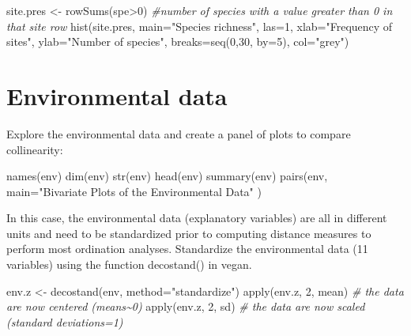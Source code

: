 \documentclass[
]{book}
\newenvironment{Shaded}{\begin{snugshade}}{\end{snugshade}}
\newcommand{\AttributeTok}[1]{\textcolor[rgb]{0.77,0.63,0.00}{#1}}
\newcommand{\CommentTok}[1]{\textcolor[rgb]{0.56,0.35,0.01}{\textit{#1}}}
\newcommand{\DecValTok}[1]{\textcolor[rgb]{0.00,0.00,0.81}{#1}}
\newcommand{\FunctionTok}[1]{\textcolor[rgb]{0.00,0.00,0.00}{#1}}
\newcommand{\NormalTok}[1]{#1}
\newcommand{\OtherTok}[1]{\textcolor[rgb]{0.56,0.35,0.01}{#1}}
\newcommand{\SpecialCharTok}[1]{\textcolor[rgb]{0.00,0.00,0.00}{#1}}
\newcommand{\StringTok}[1]{\textcolor[rgb]{0.31,0.60,0.02}{#1}}
\begin{document}
\begin{Shaded}
\begin{Highlighting}[]
\NormalTok{site.pres }\OtherTok{\textless{}{-}} \FunctionTok{rowSums}\NormalTok{(spe}\SpecialCharTok{\textgreater{}}\DecValTok{0}\NormalTok{) }\CommentTok{\#number of species with a value greater than 0 in that site row}
\FunctionTok{hist}\NormalTok{(site.pres, }\AttributeTok{main=}\StringTok{"Species richness"}\NormalTok{, }\AttributeTok{las=}\DecValTok{1}\NormalTok{, }\AttributeTok{xlab=}\StringTok{"Frequency of sites"}\NormalTok{, }\AttributeTok{ylab=}\StringTok{"Number of species"}\NormalTok{, }\AttributeTok{breaks=}\FunctionTok{seq}\NormalTok{(}\DecValTok{0}\NormalTok{,}\DecValTok{30}\NormalTok{, }\AttributeTok{by=}\DecValTok{5}\NormalTok{), }\AttributeTok{col=}\StringTok{"grey"}\NormalTok{) }
\end{Highlighting}
\end{Shaded}

\hypertarget{environmental-data}{%
\section{Environmental data}\label{environmental-data}}

Explore the environmental data and create a panel of plots to compare
collinearity:

\begin{Shaded}
\begin{Highlighting}[]
\FunctionTok{names}\NormalTok{(env)}
\FunctionTok{dim}\NormalTok{(env)}
\FunctionTok{str}\NormalTok{(env)}
\FunctionTok{head}\NormalTok{(env)}
\FunctionTok{summary}\NormalTok{(env)}
\FunctionTok{pairs}\NormalTok{(env, }\AttributeTok{main=}\StringTok{"Bivariate Plots of the Environmental Data"}\NormalTok{ ) }
\end{Highlighting}
\end{Shaded}

In this case, the environmental data (explanatory variables) are all in
different units and need to be standardized prior to computing distance
measures to perform most ordination analyses. Standardize the
environmental data (11 variables) using the function decostand() in
vegan.

\begin{Shaded}
\begin{Highlighting}[]
\NormalTok{env.z }\OtherTok{\textless{}{-}} \FunctionTok{decostand}\NormalTok{(env, }\AttributeTok{method=}\StringTok{"standardize"}\NormalTok{)}
\FunctionTok{apply}\NormalTok{(env.z, }\DecValTok{2}\NormalTok{, mean) }\CommentTok{\# the data are now centered (means\textasciitilde{}0)}
\FunctionTok{apply}\NormalTok{(env.z, }\DecValTok{2}\NormalTok{, sd)   }\CommentTok{\# the data are now scaled (standard deviations=1)}
\end{Highlighting}
\end{Shaded}
\end{document}

